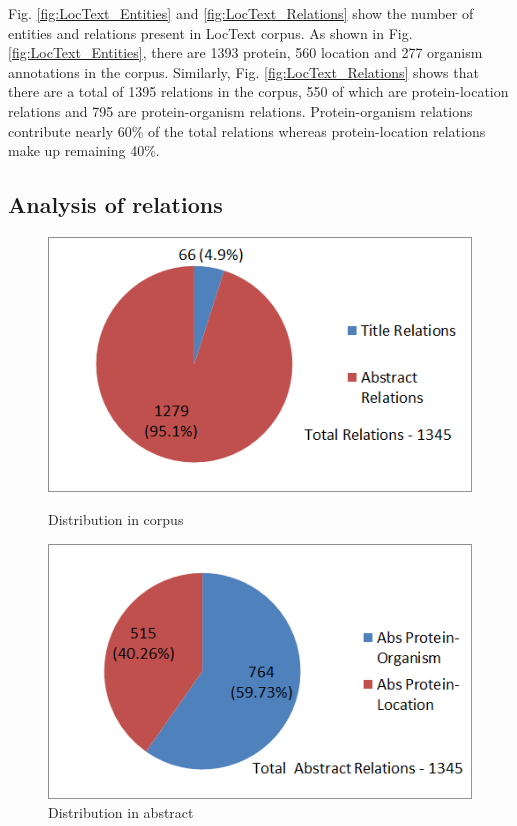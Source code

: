 Fig. \ref{fig:LocText_Entities} and \ref{fig:LocText_Relations} show the number of entities and relations present in LocText corpus. As shown in  Fig. \ref{fig:LocText_Entities}, there are 1393 protein, 560 location and 277 organism annotations in the corpus. Similarly, Fig. \ref{fig:LocText_Relations} shows that there are a total of 1395 relations in the corpus, 550 of which are protein-location relations and 795 are protein-organism relations. Protein-organism relations contribute nearly 60\% of the total relations whereas protein-location relations make up remaining 40\%.

\subsection*{Analysis of relations}

\begin{figure}
\centering
\begin{minipage}{.5\textwidth}
  \centering
  \includegraphics[width=.95\textwidth]{figures/Rel_Title_Abs_Distribution.png}
  \caption{Distribution in corpus}
  \label{fig:Rel_Title_Abs}
\end{minipage}%
\begin{minipage}{.5\textwidth}
  \centering
  \includegraphics[width=.95\textwidth]{figures/AbsRel_PO_PL_Distribution.png}
  \caption{Distribution in abstract}
  \label{fig:Rel_Abs_PO_PL}
\end{minipage}
\end{figure}


